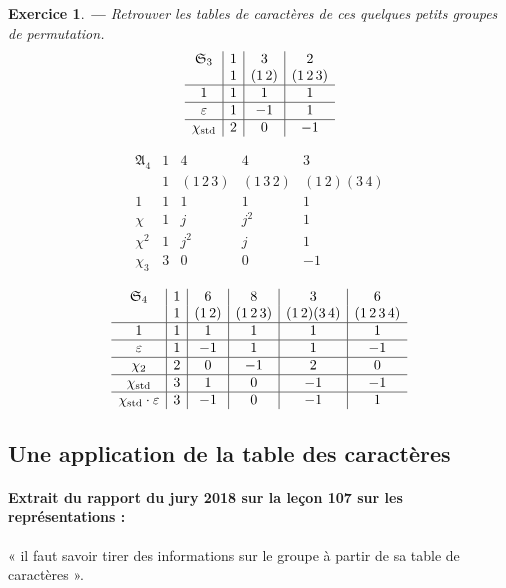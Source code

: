 \documentclass[a4paper]{article}
\newcounter{question}
\newtheorem{enonce}{Exercice}
\newenvironment{exo}[0]{\begin{enonce}{\bf ---}\rm\setcounter{question}{1}}{\end{enonce}}
\theoremstyle{definition} %
\theoremstyle{plain} %
\theoremstyle{remark} %
\begin{document}
\begin{exo}
Retrouver les tables de caractères de ces quelques petits groupes de permutation.
\[
\begin{array}{c|c|c|c}
\mathfrak{S}_3 & 1 & 3 & 2 \\
& 1 & (1 \, 2) & (1 \, 2 \, 3) \\
\hline
1 & 1 & 1 & 1 \\
\hline
\varepsilon & 1 & -1 & 1 \\
\hline
\chi_{\rm{std}} & 2 & 0 & -1 
\end{array}
\]

\[
\begin{array}{c|c|c|c|c}
\mathfrak{A}_4 & 1 & 4 & 4 & 3 \\
& 1 & (1 \, 2 \, 3) & (1 \, 3 \, 2) & (1 \, 2) (3 \, 4) \\
\hline
1 & 1 & 1 & 1 & 1 \\
\hline
\chi & 1 & j & j^2 & 1 \\
\hline
\chi^2 & 1 & j^2 & j & 1 \\
\hline 
\chi_3 & 3 & 0 & 0 & -1
\end{array}
\]

\[
\begin{array}{c|c|c|c|c|c}
\mathfrak{S}_4 & 1 & 6 & 8 & 3 & 6 \\
& 1 & (1 \, 2) & (1 \, 2 \, 3) & (1 \, 2) (3 \, 4) & (1 \, 2 \, 3 \, 4) \\
\hline
1 & 1 & 1 & 1 & 1 & 1\\
\hline
\varepsilon & 1 & -1 & 1 & 1 & -1 \\
\hline
\chi_2 & 2 & 0 & -1 & 2 & 0  \\
\hline 
\chi_{\rm{std}} & 3 & 1 & 0 & -1 & -1 \\
\hline
\chi_{\rm{std}} \cdot \varepsilon & 3 & -1 & 0 & -1 & 1 
\end{array}
\]
\end{exo}

\subsection{Une application de la table des caractères}

\paragraph{Extrait du rapport du jury 2018 sur la leçon 107 sur les représentations :} « il faut savoir tirer
des informations sur le groupe à partir de sa table de caractères ».
\end{document}
